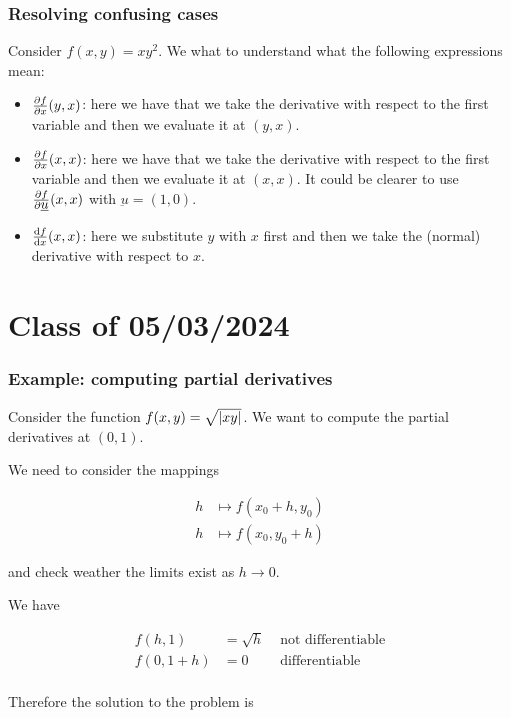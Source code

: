 \documentclass[10pt]{extarticle}
\renewcommand{\vec}[1]{\underbar{\ensuremath{#1}}}
\begin{document}
\subsubsection{Resolving confusing cases}

Consider $f(x, y) = xy^2$. We what to understand what the following expressions mean:

\begin{itemize}
    \item $\pdv{f}{x}()(y,x)$: here we have that we take the derivative with respect to the first variable and then we evaluate it at $(y, x)$.
    \item $\pdv{f}{x}()(x,x)$: here we have that we take the derivative with respect to the first variable and then we evaluate it at $(x, x)$. It could be clearer to use $\pdv{f}{\vec{u}}()(x,x)$ with $\vec{u} = (1, 0)$.
    \item $\dv{f}{x}()(x,x)$: here we substitute $y$ with $x$ first and then we take the (normal) derivative with respect to $x$.
\end{itemize}

\section{Class of 05/03/2024}

\subsubsection{Example: computing partial derivatives}

Consider the function $f(x, y) = \sqrt{\abs{xy}}$. We want to compute the partial derivatives at $(0, 1)$.

We need to consider the mappings

\begin{align*}
    h & \mapsto f(x_0 +h, y_0) \\
    h & \mapsto f(x_0, y_0 +h)
\end{align*}

and check weather the limits exist as $h \to 0$.

We have

\begin{align*}
    f(h, 1)     & = \sqrt{h} & \text{ not differentiable} \\
    f(0, 1 + h) & = 0        & \text{ differentiable}     \\
\end{align*}

Therefore the solution to the problem is
\end{document}
